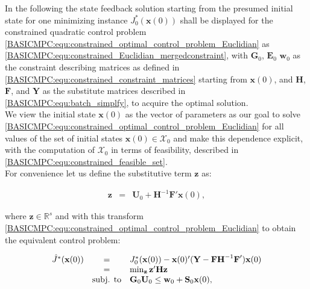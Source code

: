     In the following the state feedback solution starting from the presumed initial state for one minimizing instance $J^*_0(\textbf{x}(0))$ shall be displayed for the constrained quadratic control problem \ref{BASICMPC:equ:constrained_optimal_control_problem_Euclidian} as \ref{BASICMPC:equ:constrained_Euclidian_mergedconstraint}, with $\textbf{G}_0$, $\textbf{E}_0$ $\textbf{w}_0$ as the constraint describing matrices as defined in \ref{BASICMPC:equ:constrained_constraint_matrices} starting from $\textbf{x}(0)$, and $\textbf{H}$, $\textbf{F}$, and $\textbf{Y}$ as the substitute matrices described in \ref{BASICMPC:equ:batch_simplfy}, to acquire the optimal solution.\\
    We view the initial state $\textbf{x}(0)$ as the vector of parameters as our goal to solve \ref{BASICMPC:equ:constrained_optimal_control_problem_Euclidian} for all values of the set of initial states $\textbf{x}(0)\in\mathcal{X}_0$ and make this dependence explicit, with the computation of $\mathcal{X}_0$ in terms of feasibility, described in  \ref{BASICMPC:equ:constrained_feasible_set}.\\
    For convenience let us define the substitutive term $\textbf{z}$ as:

    \begin{equation}
    \begin{array}{rcl}
            \textbf{z}&=&\textbf{U}_0+\textbf{H}^{-1}\textbf{F}'\textbf{x}(0),
        \end{array}
        \label{BASICMPC:equ:constrained_substitute_z}
    \end{equation}

    where $\textbf{z}\in\mathbb{R}^s$ and with this transform \ref{BASICMPC:equ:constrained_optimal_control_problem_Euclidian} to obtain the equivalent control problem:

    \begin{equation}
    \begin{array}{rcl}
            \hat{J}^*(\textbf{x}(0))&=&J^*_0(\textbf{x}(0))-\textbf{x}(0)'(\textbf{Y}-\textbf{F}\textbf{H}^{-1}\textbf{F}')\textbf{x}(0)\\
            &=&\min_{\textbf{z}}\textbf{z}'\textbf{H}\textbf{z}\\
            &\textnormal{subj. to}&\textbf{G}_0\textbf{U}_0\leq\textbf{w}_0+\textbf{S}_0\textbf{x}(0),
        \end{array}
        \label{BASICMPC:equ:constrained_substitute_J}
    \end{equation}

